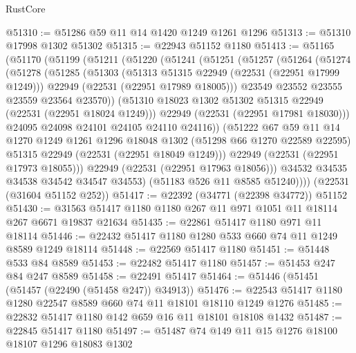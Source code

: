 \begin{lexlean}{RustCore}
\begin{coremodule}
@51310 := @51286 @59 @11 @14 @1420 @1249 @1261 @1296
@51313 := @51310 @17998 @1302 @51302
@51315 := @22943 @51152 @1180
@51413 := @51165
    (@51170
      (@51199
        (@51211
          (@51220
            (@51241
              (@51251
                (@51257
                  (@51264
                    (@51274
                      (@51278
                        (@51285
                          (@51303
                            (@51313 @51315 @22949 (@22531 (@22951 @17999 @1249)))
                            @22949
                            (@22531 (@22951 @17989 @18005)))
                          @23549
                          @23552
                          @23555
                          @23559
                          @23564
                          @23570))
                      (@51310 @18023 @1302 @51302 @51315 @22949 (@22531 (@22951 @18024 @1249)))
                      @22949
                      (@22531 (@22951 @17981 @18030)))
                    @24095
                    @24098
                    @24101
                    @24105
                    @24110
                    @24116))
                (@51222
                  @67
                  @59
                  @11
                  @14
                  @1270
                  @1249
                  @1261
                  @1296
                  @18048
                  @1302
                  (@51298 @66 @1270 @22589 @22595)
                  @51315
                  @22949
                  (@22531 (@22951 @18049 @1249)))
                @22949
                (@22531 (@22951 @17973 @18055)))
              @22949
              (@22531 (@22951 @17963 @18056)))
            @34532
            @34535
            @34538
            @34542
            @34547
            @34553)
          (@51183 @526 @11 @8585 @51240))))
    (@22531 (@31604 @51152 @252))
@51417 := @22392 (@34771 (@22398 @34772)) @51152
@51430 := @31563 @51417 @1180 @1180 @267 @11 @971 @1051 @11 @18114 @267 @6671 @19837 @21634
@51435 := @22861 @51417 @1180 @971 @11 @18114
@51446 := @22432 @51417 @1180 @1280 @533 @660 @74 @11 @1249 @8589 @1249 @18114
@51448 := @22569 @51417 @1180
@51451 := @51448 @533 @84 @8589
@51453 := @22482 @51417 @1180
@51457 := @51453 @247 @84 @247 @8589
@51458 := @22491 @51417
@51464 := @51446 (@51451 (@51457 (@22490 (@51458 @247)) @34913))
@51476 := @22543 @51417 @1180 @1280 @22547 @8589 @660 @74 @11 @18101 @18110 @1249 @1276
@51485 := @22832 @51417 @1180 @142 @659 @16 @11 @18101 @18108 @1432
@51487 := @22845 @51417 @1180
@51497 := @51487 @74 @149 @11 @15 @1276 @18100 @18107 @1296 @18083 @1302

\end{coremodule}
\end{lexlean}
